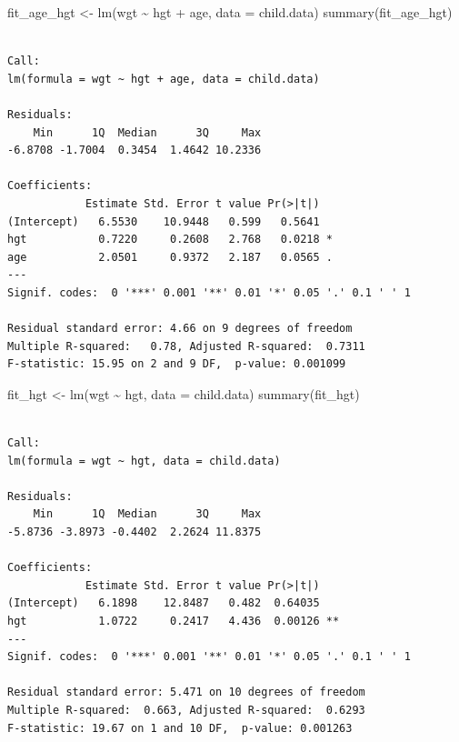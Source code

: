 \documentclass[
  letterpaper,
]{scrbook}
\newenvironment{Shaded}{\begin{snugshade}}{\end{snugshade}}
\newcommand{\AttributeTok}[1]{\textcolor[rgb]{0.40,0.45,0.13}{#1}}
\newcommand{\FunctionTok}[1]{\textcolor[rgb]{0.28,0.35,0.67}{#1}}
\newcommand{\NormalTok}[1]{\textcolor[rgb]{0.00,0.23,0.31}{#1}}
\newcommand{\OtherTok}[1]{\textcolor[rgb]{0.00,0.23,0.31}{#1}}
\newcommand{\SpecialCharTok}[1]{\textcolor[rgb]{0.37,0.37,0.37}{#1}}
\begin{document}
\begin{Shaded}
\begin{Highlighting}[]
\NormalTok{fit\_age\_hgt }\OtherTok{\textless{}{-}} \FunctionTok{lm}\NormalTok{(wgt }\SpecialCharTok{\textasciitilde{}}\NormalTok{ hgt }\SpecialCharTok{+}\NormalTok{ age, }\AttributeTok{data =}\NormalTok{ child.data)}
\FunctionTok{summary}\NormalTok{(fit\_age\_hgt)}
\end{Highlighting}
\end{Shaded}

\begin{verbatim}

Call:
lm(formula = wgt ~ hgt + age, data = child.data)

Residuals:
    Min      1Q  Median      3Q     Max 
-6.8708 -1.7004  0.3454  1.4642 10.2336 

Coefficients:
            Estimate Std. Error t value Pr(>|t|)  
(Intercept)   6.5530    10.9448   0.599   0.5641  
hgt           0.7220     0.2608   2.768   0.0218 *
age           2.0501     0.9372   2.187   0.0565 .
---
Signif. codes:  0 '***' 0.001 '**' 0.01 '*' 0.05 '.' 0.1 ' ' 1

Residual standard error: 4.66 on 9 degrees of freedom
Multiple R-squared:   0.78, Adjusted R-squared:  0.7311 
F-statistic: 15.95 on 2 and 9 DF,  p-value: 0.001099
\end{verbatim}

\begin{Shaded}
\begin{Highlighting}[]
\NormalTok{fit\_hgt }\OtherTok{\textless{}{-}} \FunctionTok{lm}\NormalTok{(wgt }\SpecialCharTok{\textasciitilde{}}\NormalTok{ hgt, }\AttributeTok{data =}\NormalTok{ child.data)}
\FunctionTok{summary}\NormalTok{(fit\_hgt)}
\end{Highlighting}
\end{Shaded}

\begin{verbatim}

Call:
lm(formula = wgt ~ hgt, data = child.data)

Residuals:
    Min      1Q  Median      3Q     Max 
-5.8736 -3.8973 -0.4402  2.2624 11.8375 

Coefficients:
            Estimate Std. Error t value Pr(>|t|)   
(Intercept)   6.1898    12.8487   0.482  0.64035   
hgt           1.0722     0.2417   4.436  0.00126 **
---
Signif. codes:  0 '***' 0.001 '**' 0.01 '*' 0.05 '.' 0.1 ' ' 1

Residual standard error: 5.471 on 10 degrees of freedom
Multiple R-squared:  0.663, Adjusted R-squared:  0.6293 
F-statistic: 19.67 on 1 and 10 DF,  p-value: 0.001263
\end{verbatim}
\end{document}
